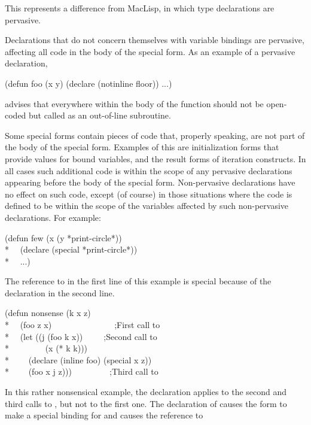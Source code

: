 \begin{defspec}
\beforenoterule
\begin{incompatibility}
This represents a difference from MacLisp, in which type
declarations are pervasive.
\end{incompatibility}
\afternoterule

Declarations that do not concern themselves with variable bindings are
pervasive, affecting all code in the body of the special form.
As an example of a pervasive declaration,
\begin{lisp}
(defun foo (x y) (declare (notinline floor)) ...)
\end{lisp}
advises that everywhere within the body of  the function
 should not be open-coded but called as an out-of-line subroutine.

Some special forms contain pieces of code that, properly speaking,
are not part of the body of the special form.  Examples of this
are initialization forms that provide values for bound variables,
and the result forms of iteration constructs.
In all cases such additional code is within the scope of any pervasive
declarations appearing before the body of the special form.
Non-pervasive declarations have no effect on such code, except (of course)
in those situations where the code is defined to be within the scope
of the variables affected by such non-pervasive declarations.
For example:
\begin{lisp}
(defun few (x  (y *print-circle*)) \\*
~~(declare (special *print-circle*)) \\*
~~...)
\end{lisp}
The reference to  in the first line of this example is special
because of the declaration in the second line.
\begin{lisp}
(defun nonsense (k x z) \\*
~~(foo z x)~~~~~~~~~~~~~~~;{\rm First call to } \\*
~~(let ((j (foo k x))~~~~~;{\rm Second call to } \\*
~~~~~~~~(x (* k k))) \\*
~~~~(declare (inline foo) (special x z)) \\*
~~~~(foo x j z)))~~~~~~~~~;{\rm Third call to }
\end{lisp}
In this rather nonsensical example,
the  declaration applies to the
second and third calls to , but not to the first one.
The  declaration of  causes the  form
to make a special binding for  and causes the reference to 

\end{defspec}
